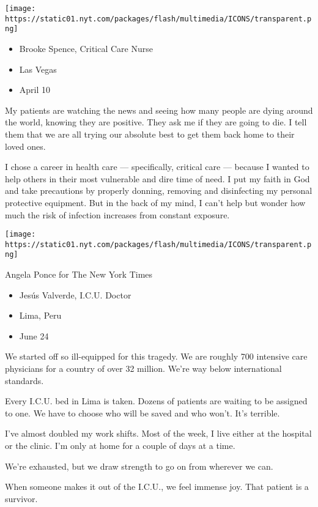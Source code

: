 \texttt{[image: https://static01.nyt.com/packages/flash/multimedia/ICONS/transparent.png]}

\begin{itemize}
\tightlist
\item
  Brooke Spence, Critical Care Nurse
\item
  Las Vegas
\item
  April 10
\end{itemize}

My patients are watching the news and seeing how many people are dying
around the world, knowing they are positive. They ask me if they are
going to die. I tell them that we are all trying our absolute best to
get them back home to their loved ones.

I chose a career in health care --- specifically, critical care ---
because I wanted to help others in their most vulnerable and dire time
of need. I put my faith in God and take precautions by properly donning,
removing and disinfecting my personal protective equipment. But in the
back of my mind, I can't help but wonder how much the risk of infection
increases from constant exposure.

\texttt{[image: https://static01.nyt.com/packages/flash/multimedia/ICONS/transparent.png]}

Angela Ponce for The New York Times

\begin{itemize}
\tightlist
\item
  Jesús Valverde, I.C.U. Doctor
\item
  Lima, Peru
\item
  June 24
\end{itemize}

We started off so ill-equipped for this tragedy. We are roughly 700
intensive care physicians for a country of over 32 million. We're way
below international standards.

Every I.C.U. bed in Lima is taken. Dozens of patients are waiting to be
assigned to one. We have to choose who will be saved and who won't. It's
terrible.

I've almost doubled my work shifts. Most of the week, I live either at
the hospital or the clinic. I'm only at home for a couple of days at a
time.

We're exhausted, but we draw strength to go on from wherever we can.

When someone makes it out of the I.C.U., we feel immense joy. That
patient is a survivor.

